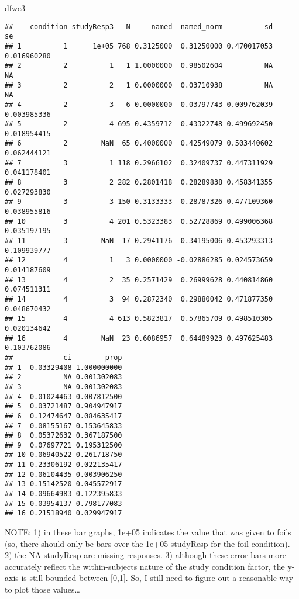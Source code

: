 \documentclass[]{article}
\newenvironment{Shaded}{\begin{snugshade}}{\end{snugshade}}
\newcommand{\NormalTok}[1]{{#1}}
\begin{document}
\begin{Shaded}
\begin{Highlighting}[]
\NormalTok{dfwc3}
\end{Highlighting}
\end{Shaded}

\begin{verbatim}
##    condition studyResp3   N     named  named_norm          sd          se
## 1          1      1e+05 768 0.3125000  0.31250000 0.470017053 0.016960280
## 2          2          1   1 1.0000000  0.98502604          NA          NA
## 3          2          2   1 0.0000000  0.03710938          NA          NA
## 4          2          3   6 0.0000000  0.03797743 0.009762039 0.003985336
## 5          2          4 695 0.4359712  0.43322748 0.499692450 0.018954415
## 6          2        NaN  65 0.4000000  0.42549079 0.503440602 0.062444121
## 7          3          1 118 0.2966102  0.32409737 0.447311929 0.041178401
## 8          3          2 282 0.2801418  0.28289838 0.458341355 0.027293830
## 9          3          3 150 0.3133333  0.28787326 0.477109360 0.038955816
## 10         3          4 201 0.5323383  0.52728869 0.499006368 0.035197195
## 11         3        NaN  17 0.2941176  0.34195006 0.453293313 0.109939777
## 12         4          1   3 0.0000000 -0.02886285 0.024573659 0.014187609
## 13         4          2  35 0.2571429  0.26999628 0.440814860 0.074511311
## 14         4          3  94 0.2872340  0.29880042 0.471877350 0.048670432
## 15         4          4 613 0.5823817  0.57865709 0.498510305 0.020134642
## 16         4        NaN  23 0.6086957  0.64489923 0.497625483 0.103762086
##            ci        prop
## 1  0.03329408 1.000000000
## 2          NA 0.001302083
## 3          NA 0.001302083
## 4  0.01024463 0.007812500
## 5  0.03721487 0.904947917
## 6  0.12474647 0.084635417
## 7  0.08155167 0.153645833
## 8  0.05372632 0.367187500
## 9  0.07697721 0.195312500
## 10 0.06940522 0.261718750
## 11 0.23306192 0.022135417
## 12 0.06104435 0.003906250
## 13 0.15142520 0.045572917
## 14 0.09664983 0.122395833
## 15 0.03954137 0.798177083
## 16 0.21518940 0.029947917
\end{verbatim}

NOTE: 1) in these bar graphs, 1e+05 indicates the value that was given
to foils (so, there should only be bars over the 1e+05 studyResp for the
foil condition). 2) the NA studyResp are missing responses. 3) although
these error bars more accurately reflect the within-subjects nature of
the study condition factor, the y-axis is still bounded between
{[}0,1{]}. So, I still need to figure out a reasonable way to plot those
values\ldots{}
\end{document}
